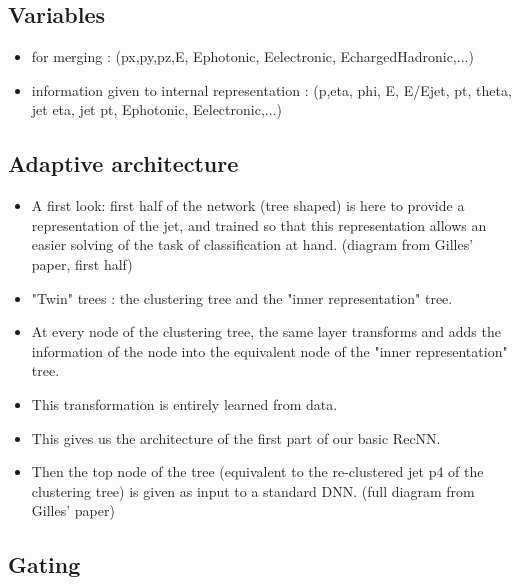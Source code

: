 \subsection{Variables}

\begin{itemize}
    \item for merging : (px,py,pz,E, Ephotonic, Eelectronic, EchargedHadronic,...)
    \item information given to internal representation : (p,eta, phi, E, E/Ejet, pt, theta, jet eta, jet pt, Ephotonic, Eelectronic,...)
\end{itemize}

\subsection{Adaptive architecture}

\begin{itemize}
    \item A first look: first half of the network (tree shaped) is here to provide a representation of the jet, and trained so that this representation allows an easier solving of the task of classification at hand. (diagram from Gilles' paper, first half)
    \item "Twin" trees : the clustering tree and the "inner representation" tree.
    \item At every node of the clustering tree, the same layer transforms and adds the information of the node into the equivalent node of the "inner representation" tree.
    \item This transformation is entirely learned from data.
    \item This gives us the architecture of the first part of our basic RecNN.
    \item Then the top node of the tree (equivalent to the re-clustered jet p4 of the clustering tree) is given as input to a standard DNN. (full diagram from Gilles' paper)
\end{itemize}

\subsection{Gating}


